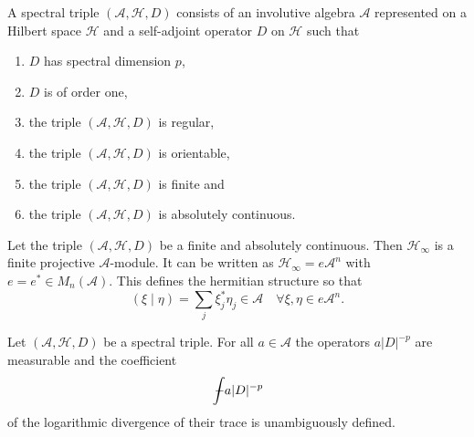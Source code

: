 \begin{definition}\label{def:spectral-triple}
    A spectral triple $(\mathcal{A}, \mathcal{H}, D)$ consists of an involutive algebra $\mathcal{A}$ represented on a Hilbert space $\mathcal{H}$ and a self-adjoint operator $D$ on $\mathcal{H}$ such that
    \begin{enumerate}
        \item $D$ has spectral dimension $p$,
        \item $D$ is of order one,
        \item the triple $(\mathcal{A}, \mathcal{H}, D)$ is regular,
        \item the triple $(\mathcal{A}, \mathcal{H}, D)$ is orientable,
        \item the triple $(\mathcal{A}, \mathcal{H}, D)$ is finite and
        \item the triple $(\mathcal{A}, \mathcal{H}, D)$ is absolutely continuous.
    \end{enumerate}
\end{definition}


\begin{lemma}[Lemma 2.0.1]\label{lem:lemma-2.0.1}
    Let the triple $(\mathcal{A}, \mathcal{H}, D)$ be a finite and absolutely continuous. Then $\mathcal{H}_\infty$ is a finite projective $\mathcal{A}$-module. It can be written as $\mathcal{H}_\infty = e \mathcal{A}^n$ with $e=e^* \in M_n(\mathcal{A})$. This defines the hermitian structure so that
    \[ 
    (\xi \mid \eta) = \sum_{j} \xi_j^*  \eta_j\in \mathcal{A} \quad \forall \xi, \eta \in e \mathcal{A}^n.
    \]
\end{lemma}


\begin{lemma}[Lemma 2.0.2]\label{lem:lemma-2.0.2}
    Let $(\mathcal{A}, \mathcal{H}, D)$ be a spectral triple. For all $a \in \mathcal{A}$ the operators $a |D|^{-p}$ are measurable and the coefficient
    \[
    \ncint \, a |D|^{-p}
    \]
    of the logarithmic divergence of their trace is unambiguously defined.
\end{lemma}

